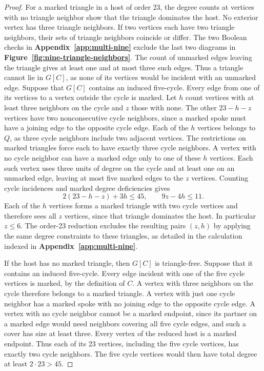 \documentclass[preprint,11pt,numbers]{elsarticle-arxiv}
\numberwithin{equation}{section}
\theoremstyle{definition}
\begin{document}
\begin{proof}
For a marked triangle in a host of order 23, the degree counts at
vertices with no triangle neighbor show that the triangle dominates
the host. No exterior vertex has three triangle neighbors. If two
vertices each have two triangle neighbors, their sets of triangle
neighbors coincide or differ. The two Boolean checks
in \textbf{Appendix~\ref{app:multi-nine}} exclude the last two diagrams
in \textbf{Figure~\ref{fig:nine-triangle-neighbors}}.
The count of unmarked edges leaving the triangle gives at least one
and at most three such edges. Thus a triangle cannot lie in $G[C]$,
as none of its vertices would be incident with an unmarked edge.
Suppose that $G[C]$ contains an induced five-cycle. Every edge from
one of its vertices to a vertex outside the cycle is marked. Let $h$
count vertices with at least three neighbors on the cycle and $z$
those with none. The other $23-h-z$ vertices have two nonconsecutive
cycle neighbors, since a marked spoke must have a joining edge to
the opposite cycle edge. Each of the $h$ vertices belongs to $Q$,
as three cycle neighbors include two adjacent vertices. The
restrictions on marked triangles force each to have exactly three
cycle neighbors. A vertex with no cycle neighbor can have a marked
edge only to one of these $h$ vertices. Each such vertex uses three
units of degree on the cycle and at least one on an unmarked edge,
leaving at most five marked edges to the $z$ vertices. Counting
cycle incidences and marked degree deficiencies gives
\[
  2(23-h-z)+3h\leq45,\qquad 9z-4h\leq11 .
\]
Each of the $h$ vertices forms a marked triangle with two cycle
vertices and therefore sees all $z$ vertices, since that triangle
dominates the host. In particular $z\leq6$. The order-23 reduction
excludes the resulting pairs $(z,h)$ by applying the same degree
constraints to these triangles, as detailed in the calculation
indexed in \textbf{Appendix~\ref{app:multi-nine}}.

If the host has no marked triangle, then $G[C]$ is triangle-free.
Suppose that it contains an induced five-cycle. Every edge incident
with one of the five cycle vertices is marked, by the definition of
$C$. A vertex with three neighbors on the cycle therefore belongs to
a marked triangle. A vertex with just one cycle neighbor has a marked
spoke with no joining edge to the opposite cycle edge. A vertex with
no cycle neighbor cannot be a marked endpoint, since its partner on
a marked edge would need neighbors covering all five cycle edges,
and such a cover has size at least three. Every vertex of the reduced
host is a marked endpoint. Thus each of its 23 vertices, including
the five cycle vertices, has exactly two cycle neighbors. The five
cycle vertices would then have total degree at least $2\cdot23>45$.


\end{proof}
\end{document}
